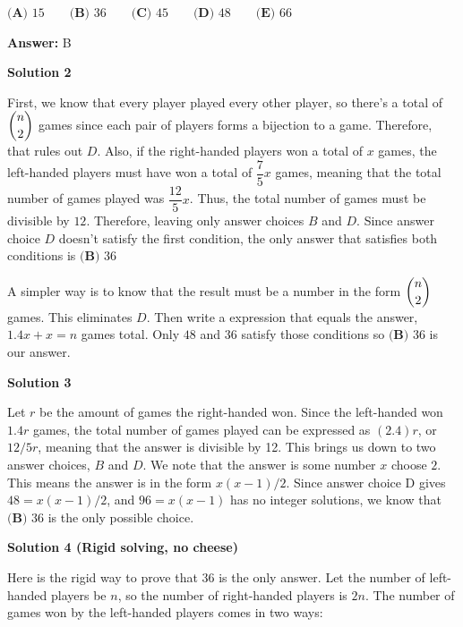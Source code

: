 \begin{enumerate}
 $\textbf{(A) }15\qquad\textbf{(B) }36\qquad\textbf{(C) }45\qquad\textbf{(D) }48\qquad\textbf{(E) }66$

 \textbf{Answer: }B



\textbf{Solution 2}

First, we know that every player played every other player, so there's a total of $\dbinom{n}{2}$ games since each pair of players forms a bijection to a game. Therefore, that rules out $D$. Also, if the right-handed players won a total of $x$ games, the left-handed players must have won a total of $\dfrac{7}{5}x$ games, meaning that the total number of games played was $\dfrac{12}{5}x$. Thus, the total number of games must be divisible by $12$. Therefore, leaving only answer choices $B$ and $D$. Since answer choice $D$ doesn't satisfy the first condition, the only answer that satisfies both conditions is $\boxed{\textbf{(B) }36}$

 


 A simpler way is to know that the result must be a number in the form $\dbinom{n}{2}$ games. This eliminates $D$. Then write a expression that equals the answer, $1.4x + x = n$ games total. Only $48$ and $36$ satisfy those conditions so $\boxed{\textbf{(B) }36}$ is our answer.

 



\textbf{Solution 3}

Let $r$ be the amount of games the right-handed won. Since the left-handed won $1.4r$ games, the total number of games played can be expressed as $(2.4)r$, or $12/5r$, meaning that the answer is divisible by 12. This brings us down to two answer choices, $B$ and $D$. We note that the answer is some number $x$ choose $2$. This means the answer is in the form $x(x-1)/2$. Since answer choice D gives $48 = x(x-1)/2$, and $96 = x(x-1)$ has no integer solutions, we know that $\boxed{\textbf{(B) }36}$ is the only possible choice.

 



\textbf{Solution 4 (Rigid solving, no cheese)}

Here is the rigid way to prove that $36$ is the only answer. Let the number of left-handed players be $n$, so the number of right-handed players is $2n$. The number of games won by the left-handed players comes in two ways: 


\end{enumerate}
